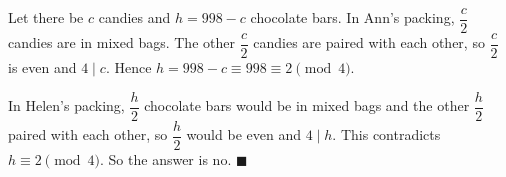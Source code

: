 Let there be $c$ candies and $h=998-c$ chocolate bars. In Ann's packing, $\dfrac c2$ candies are in mixed bags. The other $\dfrac c2$ candies are paired with each other, so $\dfrac c2$ is even and $4\mid c$. Hence $h=998-c\equiv998\equiv2\pmod4$.

In Helen's packing, $\dfrac h2$ chocolate bars would be in mixed bags and the other $\dfrac h2$ paired with each other, so $\dfrac h2$ would be even and $4\mid h$. This contradicts $h\equiv2\pmod 4$. So the answer is $\boxed{\text{no}}$. $\blacksquare$
